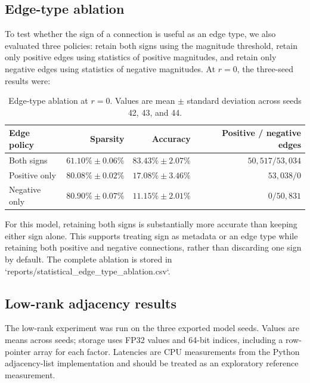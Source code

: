 \documentclass[11pt]{article}
\begin{document}
\subsection{Edge-type ablation}

To test whether the sign of a connection is useful as an edge type, we also
evaluated three policies: retain both signs using the magnitude threshold,
retain only positive edges using statistics of positive magnitudes, and retain
only negative edges using statistics of negative magnitudes.  At $r=0$, the
three-seed results were:

\begin{table}[ht]
\centering
\caption{Edge-type ablation at $r=0$. Values are mean $\pm$ standard deviation
across seeds 42, 43, and 44.}
\label{tab:edgeablation}
\small
\begin{tabular}{lrrr}
\toprule
Edge policy & Sparsity & Accuracy & Positive / negative edges \\
\midrule
Both signs & $61.10\%\pm0.06\%$ & $83.43\%\pm2.07\%$ & $50,517 / 53,034$ \\
Positive only & $80.08\%\pm0.02\%$ & $17.08\%\pm3.46\%$ & $53,038 / 0$ \\
Negative only & $80.90\%\pm0.07\%$ & $11.15\%\pm2.01\%$ & $0 / 50,831$ \\
\bottomrule
\end{tabular}
\end{table}

For this model, retaining both signs is substantially more accurate than
keeping either sign alone.  This supports treating sign as metadata or an edge
type while retaining both positive and negative connections, rather than
discarding one sign by default.  The complete ablation is stored in
`reports/statistical_edge_type_ablation.csv`.

\subsection{Low-rank adjacency results}

The low-rank experiment was run on the three exported model seeds.  Values are
means across seeds; storage uses FP32 values and 64-bit indices, including a
row-pointer array for each factor.  Latencies are CPU measurements from the
Python adjacency-list implementation and should be treated as an exploratory
reference measurement.
\end{document}
